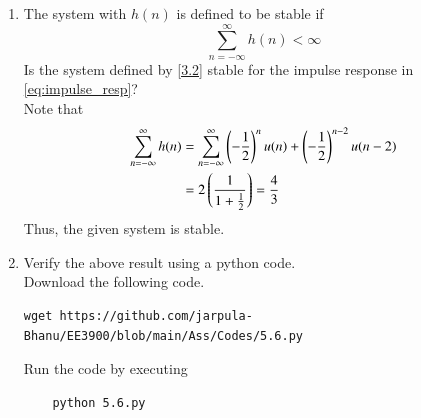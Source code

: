 \documentclass[journal,12pt,twocolumn]{IEEEtran}
\renewcommand\thesection{\arabic{section}}
\begin{document}
\begin{enumerate}[label=\thesection.\arabic*
,ref=\thesection.\theenumi]
Therefore, $h(n)$ is convergent which implies that it is bounded.
\item The system with $h(n)$ is defined to be stable if
\begin{equation}
\sum_{n=-\infty}^{\infty}h(n) < \infty
\end{equation}
Is the system defined by \eqref{3.2} stable for the impulse response in \eqref{eq:impulse_resp}?\\
%
\solution Note that
\begin{align}
	\sum_{n=-\infty}^\infty h(n) &= \sum_{n=-\infty}^\infty \left(-\frac{1}{2}\right)^nu(n)+\left(-\frac{1}{2}\right)^{n-2}u(n-2)\\
	&= 2\left(\frac{1}{1+\frac{1}{2}}\right) = \frac{4}{3}
\end{align}
Thus, the given system is stable.
\item Verify the above result using a python code.\\
\solution Download the following code.
\begin{lstlisting}
wget https://github.com/jarpula-Bhanu/EE3900/blob/main/Ass/Codes/5.6.py
\end{lstlisting}

Run the code by executing
\begin{lstlisting}
	python 5.6.py
\end{lstlisting}


\end{enumerate}
\end{document}

